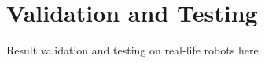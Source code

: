 \chapter{Validation and Testing} 
\label{chap:validation}

Result validation and testing on real-life robots here